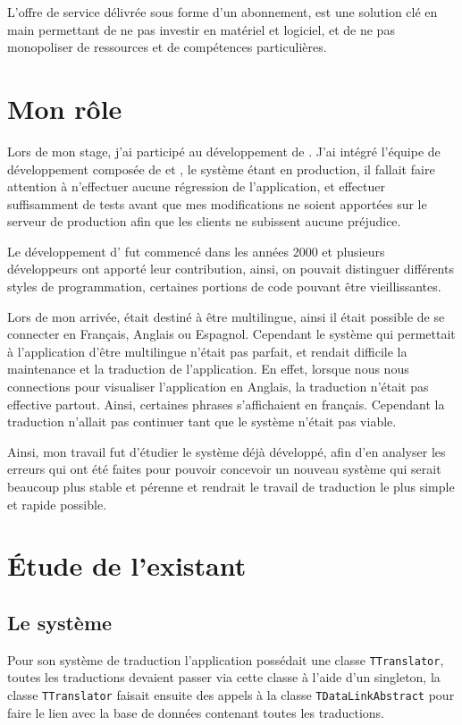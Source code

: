 L’offre de service \adt{} délivrée sous forme d’un abonnement, est une solution clé en main permettant de ne pas investir en matériel et logiciel, et de ne pas monopoliser de ressources et de compétences particulières.


\section{Mon rôle}
Lors de mon stage, j'ai participé au développement de \adt{}. J'ai intégré l'équipe de développement composée de \Romain{} et \Denis{}, le système étant en production, il fallait faire attention à n'effectuer aucune régression de l'application,
et effectuer suffisamment de tests avant que mes modifications ne soient apportées sur le serveur de production afin que les clients ne subissent aucune préjudice.

Le développement d'\adt{} fut commencé dans les années 2000 et plusieurs développeurs ont apporté leur contribution, ainsi, on pouvait distinguer différents styles de programmation, certaines portions de code pouvant être vieillissantes.

Lors de mon arrivée, \adt{} était destiné à être multilingue, ainsi il était possible de se connecter en Français, Anglais ou Espagnol. Cependant le système qui permettait à l'application d'être multilingue n'était pas parfait, et rendait difficile la maintenance et
la traduction de l'application. En effet, lorsque nous nous connections pour visualiser l'application en Anglais, la traduction n'était pas effective partout. Ainsi, certaines phrases s'affichaient en français. Cependant la traduction n'allait pas continuer tant que le système n'était pas viable.

Ainsi, mon travail fut d'étudier le système déjà développé, afin d'en analyser les erreurs qui ont été faites pour pouvoir concevoir un nouveau système qui serait beaucoup plus stable et pérenne et rendrait le travail de traduction le plus simple et rapide possible.


\section{\'Etude de l'existant}
\subsection{Le système}
Pour son système de traduction l'application possédait une classe \texttt{TTranslator}, toutes les traductions devaient passer via cette classe à l'aide d'un singleton, la classe \texttt{TTranslator} faisait ensuite des appels à la classe \texttt{TDataLinkAbstract} pour faire le lien
avec la base de données contenant toutes les traductions.
